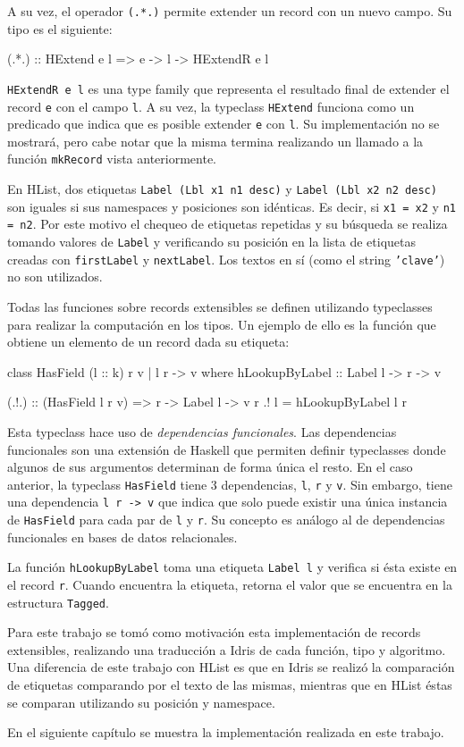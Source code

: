 A su vez, el operador \texttt{(.*.)} permite extender un record con un nuevo campo. Su tipo es el siguiente:

\begin{code}
(.*.) :: HExtend e l => e -> l -> HExtendR e l
\end{code}

\texttt{HExtendR e l} es una type family que representa el resultado final de extender el record \texttt{e} con el campo \texttt{l}. A su vez, la typeclass \texttt{HExtend} funciona como un predicado que indica que es posible extender \texttt{e} con \texttt{l}. Su implementación no se mostrará, pero cabe notar que la misma termina realizando un llamado a la función \texttt{mkRecord} vista anteriormente.

En HList, dos etiquetas \texttt{Label (Lbl x1 n1 desc)} y \texttt{Label (Lbl x2 n2 desc)} son iguales si sus namespaces y posiciones son idénticas. Es decir, si \texttt{x1 = x2} y \texttt{n1 = n2}. Por este motivo el chequeo de etiquetas repetidas y su búsqueda se realiza tomando valores de \texttt{Label} y verificando su posición en la lista de etiquetas creadas con \texttt{firstLabel} y \texttt{nextLabel}. Los textos en sí (como el string \texttt{'clave'}) no son utilizados.

Todas las funciones sobre records extensibles se definen utilizando typeclasses para realizar la computación en los tipos. Un ejemplo de ello es la función que obtiene un elemento de un record dada su etiqueta:

\begin{code}
class HasField (l :: k) r v | l r -> v where
  hLookupByLabel :: Label l -> r -> v

(.!.) :: (HasField l r v) => r -> Label l -> v
r .! l = hLookupByLabel l r
\end{code}

Esta typeclass hace uso de \textit{dependencias funcionales}. Las dependencias funcionales son una extensión de Haskell que permiten definir typeclasses donde algunos de sus argumentos determinan de forma única el resto. En el caso anterior, la typeclass \texttt{HasField} tiene 3 dependencias, \texttt{l}, \texttt{r} y \texttt{v}. Sin embargo, tiene una dependencia \texttt{l r -> v} que indica que solo puede existir una única instancia de \texttt{HasField} para cada par de \texttt{l} y \texttt{r}. Su concepto es análogo al de dependencias funcionales en bases de datos relacionales.

La función \texttt{hLookupByLabel} toma una etiqueta \texttt{Label l} y verifica si ésta existe en el record \texttt{r}. Cuando encuentra la etiqueta, retorna el valor que se encuentra en la estructura \texttt{Tagged}.

Para este trabajo se tomó como motivación esta implementación de records extensibles, realizando una traducción a Idris de cada función, tipo y algoritmo. Una diferencia de este trabajo con HList es que en Idris se realizó la comparación de etiquetas comparando por el texto de las mismas, mientras que en HList éstas se comparan utilizando su posición y namespace.

En el siguiente capítulo se muestra la implementación realizada en este trabajo.

